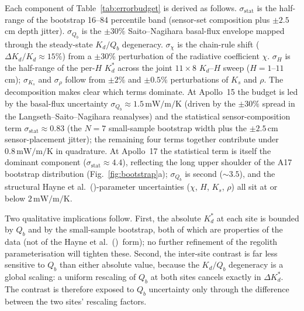 \documentclass[11pt]{article}
\newcommand{\Hayne}{Hayne et al.\ (\citeyear{hayne2017})}
\begin{document}
Each component of Table~\ref{tab:errorbudget} is derived as follows.
$\sigma_\mathrm{stat}$ is the half-range of the bootstrap 16--84
percentile band (sensor-set composition plus $\pm 2.5$\,cm depth
jitter). $\sigma_{Q_b}$ is the $\pm 30\%$ Saito--Nagihara basal-flux
envelope mapped through the steady-state $K_d/Q_b$ degeneracy.
$\sigma_\chi$ is the chain-rule shift ($\Delta K_d/K_d\!\approx\!15\%$)
from a $\pm 30\%$ perturbation of the radiative coefficient $\chi$.
$\sigma_H$ is the half-range of the per-$H$ $K_d^{*}$ across the joint
$11\times8$ $K_d$--$H$ sweep ($H=1$--$11$\,cm); $\sigma_{K_s}$ and
$\sigma_\rho$ follow from $\pm 2\%$ and $\pm 0.5\%$ perturbations of
$K_s$ and $\rho$. The decomposition makes clear which terms dominate.
At Apollo~15 the budget is led by the basal-flux uncertainty
$\sigma_{Q_b}\!\approx\!1.5\,\si{\milli\watt\per\meter\per\kelvin}$
(driven by the $\pm 30\%$ spread in the Langseth--Saito--Nagihara
reanalyses) and the statistical sensor-composition term
$\sigma_\mathrm{stat}\!\approx\!0.83$ (the $N\!=\!7$ small-sample
bootstrap width plus the $\pm 2.5$\,cm sensor-placement jitter); the
remaining four terms together contribute under
$0.8\,\si{\milli\watt\per\meter\per\kelvin}$ in quadrature. At
Apollo~17 the statistical term is itself the dominant component
($\sigma_\mathrm{stat}\!\approx\!4.4$), reflecting the long upper
shoulder of the A17 bootstrap distribution
(Fig.~\ref{fig:bootstrap}a); $\sigma_{Q_b}$ is second
($\sim\!3.5$), and the structural \Hayne-parameter uncertainties
($\chi$, $H$, $K_s$, $\rho$) all sit at or below
$2\,\si{\milli\watt\per\meter\per\kelvin}$.

Two qualitative implications follow. First, the absolute $K_d^{*}$
at each site is bounded by $Q_b$ and by the small-sample bootstrap,
both of which are properties of the data (not of the \Hayne\ form);
no further refinement of the regolith parameterisation will tighten
these. Second, the inter-site contrast is far less sensitive to
$Q_b$ than either absolute value, because the $K_d/Q_b$ degeneracy
is a global scaling: a uniform rescaling of $Q_b$ at both
sites cancels exactly in $\Delta K_d^{*}$. The contrast is therefore
exposed to $Q_b$ uncertainty only through the difference
between the two sites' rescaling factors.
\end{document}
